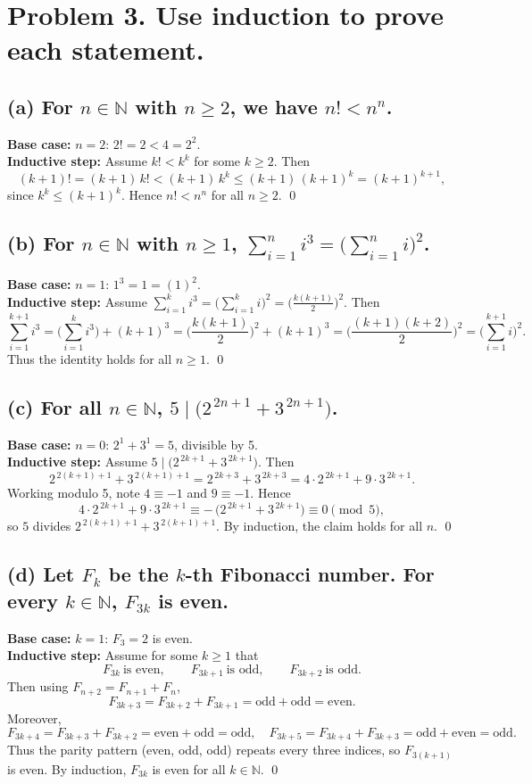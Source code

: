 \section*{Problem 3. Use induction to prove each statement.}

\subsection*{(a) For $n\in\mathbb{N}$ with $n\ge 2$, we have $n!<n^n$.}
\textbf{Base case:} $n=2$: $2!=2<4=2^2$. \\
\textbf{Inductive step:} Assume $k!\!<\!k^k$ for some $k\ge 2$. Then
\[
(k+1)!=(k+1)\,k!<(k+1)\,k^k\le (k+1)\,(k+1)^k=(k+1)^{k+1},
\]
since $k^k\le (k+1)^k$. Hence $n!<n^n$ for all $n\ge2$. \qed

\subsection*{(b) For $n\in\mathbb{N}$ with $n\ge1$, $\displaystyle\sum_{i=1}^{n} i^{3}=\Big(\sum_{i=1}^{n} i\Big)^{2}$.}
\textbf{Base case:} $n=1$: $1^{3}=1=(1)^{2}$. \\
\textbf{Inductive step:} Assume $\sum_{i=1}^{k} i^{3}=\big(\sum_{i=1}^{k} i\big)^{2}=\big(\tfrac{k(k+1)}{2}\big)^{2}$. Then
\[
\sum_{i=1}^{k+1} i^{3}
=\bigg(\sum_{i=1}^{k} i^{3}\bigg)+(k+1)^{3}
=\bigg(\frac{k(k+1)}{2}\bigg)^{2}+(k+1)^{3}
=\bigg(\frac{(k+1)(k+2)}{2}\bigg)^{2}
=\bigg(\sum_{i=1}^{k+1} i\bigg)^{2}.
\]
Thus the identity holds for all $n\ge1$. \qed

\subsection*{(c) For all $n\in\mathbb{N}$, $5\mid \big(2^{\,2n+1}+3^{\,2n+1}\big)$.}
\textbf{Base case:} $n=0$: $2^{1}+3^{1}=5$, divisible by 5. \\
\textbf{Inductive step:} Assume $5\mid \big(2^{\,2k+1}+3^{\,2k+1}\big)$. Then
\[
2^{\,2(k+1)+1}+3^{\,2(k+1)+1}
=2^{\,2k+3}+3^{\,2k+3}
=4\cdot 2^{\,2k+1}+9\cdot 3^{\,2k+1}.
\]
Working modulo 5, note $4\equiv -1$ and $9\equiv -1$. Hence
\[
4\cdot 2^{\,2k+1}+9\cdot 3^{\,2k+1}\equiv
-\,\big(2^{\,2k+1}+3^{\,2k+1}\big)\equiv 0 \pmod{5},
\]
so $5$ divides $2^{\,2(k+1)+1}+3^{\,2(k+1)+1}$. By induction, the claim holds for all $n$. \qed

\subsection*{(d) Let $F_k$ be the $k$-th Fibonacci number. For every $k\in\mathbb{N}$, $F_{3k}$ is even.}
\textbf{Base case:} $k=1$: $F_{3}=2$ is even. \\
\textbf{Inductive step:} Assume for some $k\ge1$ that
\[
F_{3k}\ \text{is even},\qquad F_{3k+1}\ \text{is odd},\qquad F_{3k+2}\ \text{is odd}.
\]
Then using $F_{n+2}=F_{n+1}+F_n$,
\[
F_{3k+3}=F_{3k+2}+F_{3k+1}=\text{odd}+\text{odd}=\text{even}.
\]
Moreover,
\[
F_{3k+4}=F_{3k+3}+F_{3k+2}=\text{even}+\text{odd}=\text{odd},\quad
F_{3k+5}=F_{3k+4}+F_{3k+3}=\text{odd}+\text{even}=\text{odd}.
\]
Thus the parity pattern (even, odd, odd) repeats every three indices, so $F_{3(k+1)}$ is even. By induction, $F_{3k}$ is even for all $k\in\mathbb{N}$. \qed
